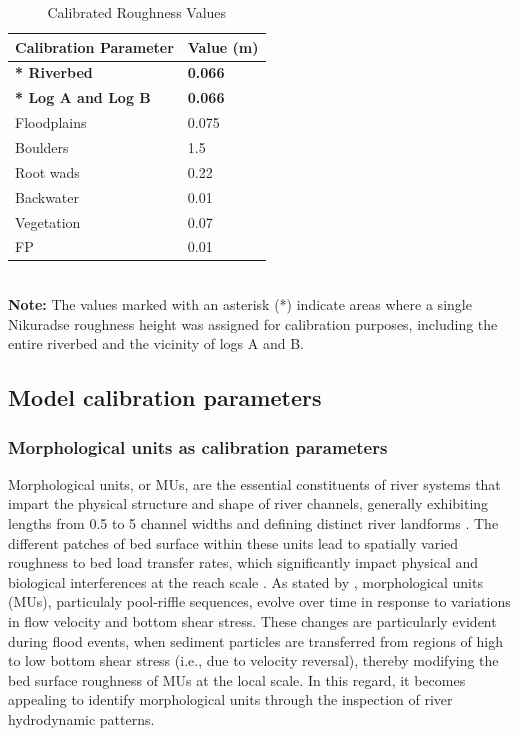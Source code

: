 \documentclass[draft,linenumbers,onecolumn]{agujournal2019} %
\begin{document}
\begin{table}[H]
	\centering
	\caption{Calibrated Roughness Values}
	\begin{tabular}{p{6cm} p{4cm}}
		\hline
		\multicolumn{1}{c}{\textbf{Calibration Parameter}} & \multicolumn{1}{c}{\textbf{Value (m)}} \\ \hline
		\textbf{* Riverbed}  & \textbf{0.066} \\ 
		\textbf{* Log A and Log B} & \textbf{0.066} \\ 
		Floodplains & 0.075 \\ 
		Boulders & 1.5 \\ 
		Root wads & 0.22 \\ 
		Backwater & 0.01 \\ 
		Vegetation & 0.07 \\ 
		FP & 0.01 \\ \hline
	\end{tabular}
	\label{tab:calibrated_roughness}\\
	\textbf{Note:} The values marked with an asterisk (*) indicate areas where a single Nikuradse roughness height was assigned for calibration purposes, including the entire riverbed and the vicinity of logs A and B.
\end{table}

\subsection{Model calibration parameters}
\label{sec:Sec2.5}

\subsubsection{Morphological units as calibration parameters}
Morphological units, or MUs, are the essential constituents of river systems that impart the physical structure and shape of river channels, generally exhibiting lengths from 0.5 to 5 channel widths and defining distinct river landforms \cite{woodworth2022are}. The different patches of bed surface within these units lead to spatially varied roughness to bed load transfer rates, which significantly impact physical and biological interferences at the reach scale \cite{buffington1999effects,dietrich2005sediment}. As stated by , morphological units (MUs), particulaly pool-riffle sequences, evolve over time in response to variations in flow velocity and bottom shear stress. These changes are particularly evident during flood events, when sediment particles are transferred from regions of high to low bottom shear stress (i.e., due to velocity reversal), thereby modifying the bed surface roughness of MUs at the local scale. In this regard, it becomes appealing to identify morphological units through the inspection of river hydrodynamic patterns. 
\end{document}
